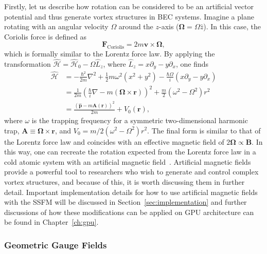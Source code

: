 Firstly, let us describe how rotation can be considered to be an artificial vector potential and thus generate vortex structures in BEC systems.
Imagine a plane rotating with an angular velocity $\Omega$ around the $z$-axis ($\mathbf{\Omega} = \Omega \hat z$). 
In this case, the Coriolis force is defined as
\begin{equation}
\mathbf{F}_{\text{Coriolis}} = 2m \mathbf{v} \times \mathbf{\Omega},
\end{equation}
which is formally similar to the Lorentz force law.
By applying the transformation $\mathcal{\hat H} = \mathcal{\hat H}_0 - \Omega \hat L_z$, where $\hat L_z = x\partial_y - y\partial_x$, one finds~\cite{bhat2008}
\begin{equation}
\begin{split}
\mathcal{\hat H} &= -\frac{\hbar^2}{2m}\nabla^2 + \frac 1 2 m \omega^2(x^2 + y^2) - \frac{\hbar \Omega}{i}(x\partial_y - y\partial_x) \\
 &= \frac{1}{2m}\left(\frac{\hbar}{i}\nabla - m(\mathbf{\Omega} \times \mathbf{r})\right)^2 + \frac m 2 \left( \omega^2 - \Omega^2 \right)r^2 \\
 &= \frac{(\hat{\mathbf{p}}-m\mathbf{A}(\mathbf{r}))^2}{2m}+ V_0(\mathbf{r}),
\end{split}
\end{equation}
where $\omega$ is the trapping frequency for a symmetric two-dimensional harmonic trap, $\mathbf{A} \equiv \mathbf{\Omega} \times \mathbf{r}$, and $V_0 = m/2 \left( \omega^2 - \Omega^2 \right)r^2$.
The final form is similar to that of the Lorentz force law and coincides with an effective magnetic field of $2 \mathbf \Omega \propto \mathbf B$.
In this way, one can recreate the rotation expected from the Lorentz force law in a cold atomic system with an artificial magnetic field~\cite{peshkin1989, madison2000, abo2001}.
Artificial magnetic fields provide a powerful tool to researchers who wish to generate and control complex vortex structures, and because of this, it is worth discussing them in further detail.
Important implementation details for how to use artificial magnetic fields with the SSFM will be discussed in Section~\ref{sec:implementation} and further discussions of how these modifications can be applied on GPU architecture can be found in Chapter~\ref{ch:gpu}.

\subsubsection{Geometric Gauge Fields}
\label{sec:geom}

